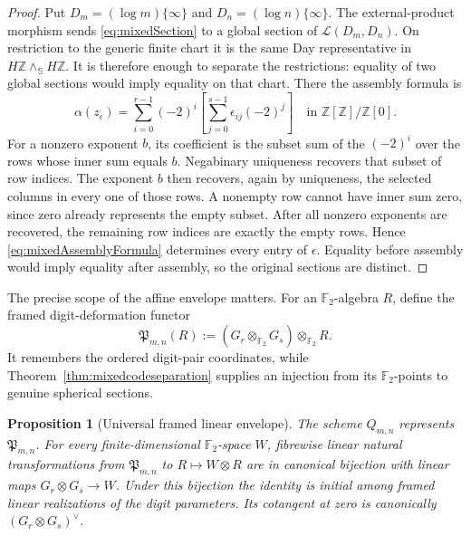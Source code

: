 \documentclass[11pt]{amsart}
\newtheorem{proposition}[theorem]{Proposition}
\theoremstyle{definition}
\theoremstyle{remark}
\newcommand{\Z}{\mathbb Z}
\begin{document}
\begin{proof}
Put $D_m=(\log m)\{\infty\}$ and $D_n=(\log n)\{\infty\}$.  The
external-product morphism sends \eqref{eq:mixedSection} to a global
section of $\mathcal L(D_m,D_n)$.  On restriction to the generic finite chart it
is the same Day representative in $H\Z\wedge_{\mathbb S}H\Z$.  It is
therefore enough to separate the restrictions: equality of two global
sections would imply equality on that chart.  There the assembly formula is
\begin{equation}\label{eq:mixedAssemblyFormula}
 \alpha(z_\epsilon)=
 \sum_{i=0}^{r-1}(-2)^i
 \left[\sum_{j=0}^{s-1}\epsilon_{ij}(-2)^j\right]
 \quad\text{in }\Z[\Z]/\Z[0].
\end{equation}
For a nonzero exponent $b$, its coefficient is the subset sum of the
$(-2)^i$ over the rows whose inner sum equals $b$.  Negabinary uniqueness
recovers that subset of row indices.  The exponent $b$ then recovers, again
by uniqueness, the selected columns in every one of those rows.  A nonempty
row cannot have inner sum zero, since zero already represents the empty
subset.  After all nonzero exponents are recovered, the remaining row
indices are exactly the empty rows.  Hence \eqref{eq:mixedAssemblyFormula}
determines every entry of $\epsilon$.  Equality before assembly would imply
equality after assembly, so the original sections are distinct.
\end{proof}

The precise scope of the affine envelope matters.  For an
$\mathbb F_2$-algebra $R$, define the framed digit-deformation functor
\begin{equation}\label{eq:digitDeformationFunctor}
 \mathfrak P_{m,n}(R):=(G_r\otimes_{\mathbb F_2}G_s)
                       \otimes_{\mathbb F_2}R.
\end{equation}
It remembers the ordered digit-pair coordinates, while
Theorem~\ref{thm:mixedcodeseparation} supplies an injection from its
$\mathbb F_2$-points to genuine spherical sections.

\begin{proposition}[Universal framed linear envelope]
\label{prop:universalCodeEnvelope}
The scheme $Q_{m,n}$ represents $\mathfrak P_{m,n}$.  For every
finite-dimensional $\mathbb F_2$-space $W$, fibrewise linear natural
transformations from $\mathfrak P_{m,n}$ to $R\mapsto W\otimes R$ are in
canonical bijection with linear maps $G_r\otimes G_s\to W$.  Under this
bijection the identity is initial among framed linear realizations of the
digit parameters.  Its cotangent at zero is canonically
$(G_r\otimes G_s)^\vee$.
\end{proposition}
\end{document}
